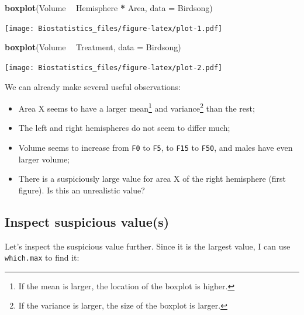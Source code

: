 \documentclass[
]{book}
\newenvironment{Shaded}{\begin{snugshade}}{\end{snugshade}}
\newcommand{\DataTypeTok}[1]{\textcolor[rgb]{0.13,0.29,0.53}{#1}}
\newcommand{\KeywordTok}[1]{\textcolor[rgb]{0.13,0.29,0.53}{\textbf{#1}}}
\newcommand{\NormalTok}[1]{#1}
\newcommand{\OperatorTok}[1]{\textcolor[rgb]{0.81,0.36,0.00}{\textbf{#1}}}
\newcommand{\StringTok}[1]{\textcolor[rgb]{0.31,0.60,0.02}{#1}}
\providecommand{\tightlist}{%
  \setlength{\itemsep}{0pt}\setlength{\parskip}{0pt}}
\begin{document}
\begin{Shaded}
\begin{Highlighting}[]
\KeywordTok{boxplot}\NormalTok{(Volume }\OperatorTok{~}\StringTok{ }\NormalTok{Hemisphere }\OperatorTok{*}\StringTok{ }\NormalTok{Area, }\DataTypeTok{data =}\NormalTok{ Birdsong)}
\end{Highlighting}
\end{Shaded}

\texttt{[image: Biostatistics\_files/figure-latex/plot-1.pdf]}

\begin{Shaded}
\begin{Highlighting}[]
\KeywordTok{boxplot}\NormalTok{(Volume }\OperatorTok{~}\StringTok{ }\NormalTok{Treatment, }\DataTypeTok{data =}\NormalTok{ Birdsong)}
\end{Highlighting}
\end{Shaded}

\texttt{[image: Biostatistics\_files/figure-latex/plot-2.pdf]}

We can already make several useful observations:

\begin{itemize}
\tightlist
\item
  Area X seems to have a larger mean\footnote{If the mean is larger, the location of the boxplot is higher.} and variance\footnote{If the variance is larger, the size of the boxplot is larger.} than the rest;
\item
  The left and right hemispheres do not seem to differ much;
\item
  Volume seems to increase from \texttt{F0} to \texttt{F5}, to \texttt{F15} to \texttt{F50}, and males have even larger volume;
\item
  There is a suspiciously large value for area X of the right hemisphere (first figure). Is this an unrealistic value?
\end{itemize}

\hypertarget{inspect-suspicious-values}{%
\subsection{Inspect suspicious value(s)}\label{inspect-suspicious-values}}

Let's inspect the suspicious value further. Since it is the largest value, I can use \texttt{which.max} to find it:

\begin{Shaded}
\end{Shaded}
\end{document}
